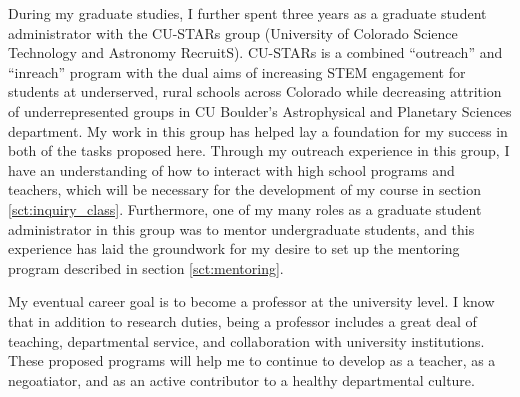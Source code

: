 \documentclass[aasms,11pt]{article}
\begin{document}
During my graduate studies, I further spent three years as a graduate student administrator with the CU-STARs group (University of Colorado Science Technology and Astronomy RecruitS).
CU-STARs is a combined ``outreach'' and ``inreach'' program with the dual aims of increasing STEM engagement for students at underserved, rural schools across Colorado while decreasing attrition of underrepresented groups in CU Boulder's Astrophysical and Planetary Sciences department.
My work in this group has helped lay a foundation for my success in both of the tasks proposed here.
Through my outreach experience in this group, I have an understanding of how to interact with high school programs and teachers, which will be necessary for the development of my course in section \ref{sct:inquiry_class}.
Furthermore, one of my many roles as a graduate student administrator in this group was to mentor undergraduate students, and this experience has laid the groundwork for my desire to set up the mentoring program described in section \ref{sct:mentoring}.

My eventual career goal is to become a professor at the university level.
I know that in addition to research duties, being a professor includes a great deal of teaching, departmental service, and collaboration with university institutions.
These proposed programs will help me to continue to develop as a teacher, as a negoatiator, and as an active contributor to a healthy departmental culture.


\newpage


\end{document}
